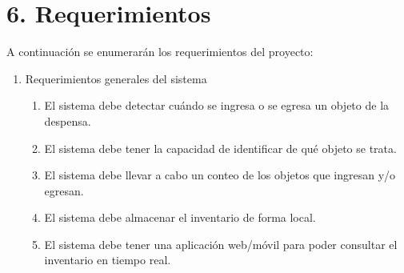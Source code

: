 \documentclass[
11pt, %
codirector, %
]{charter}
\begin{document}
\newpage

\section{6. Requerimientos}
\label{sec:requerimientos}


A continuación se enumerarán los requerimientos del proyecto:

\begin{enumerate}
	\item Requerimientos generales del sistema
		\begin{enumerate}
			\item El sistema debe detectar cuándo se ingresa o se egresa un objeto de la despensa.
			\item El sistema debe tener la capacidad de identificar de qué objeto se trata.
			\item El sistema debe llevar a cabo un conteo de los objetos que ingresan y/o egresan.
    \item El sistema debe almacenar el inventario de forma local.
    \item El sistema debe tener una aplicación web/móvil para poder consultar el inventario en tiempo real.
           

\end{enumerate}
\end{enumerate}
\end{document}
